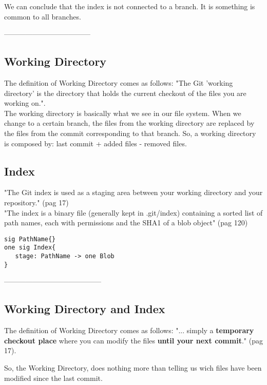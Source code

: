 We can conclude that the index is not connected to a branch. It is something is common to all branches.



------------------------------------
\subsection{Working Directory}
The definition of Working Directory comes as follows:
"The Git 'working directory' is the directory that holds 
the current checkout of the files you are working on.".\\

The working directory is basically what we see in our file 
system. When we change to a certain branch, the files from the 
working directory are replaced by the files from the commit 
corresponding to that branch. So, a working directory is 
composed by: last commit + added files - removed files.\\


\subsection{Index}
"The Git index is used as a staging area between your working directory and your repository." \cite{gitComm} (pag 17)\\
"The index is a binary file (generally kept in .git/index) containing a sorted list of path names, each with permissions and the
SHA1 of a blob object" \cite{gitComm} (pag 120)\\
\begin{lstlisting}
sig PathName{}
one sig Index{
   stage: PathName -> one Blob
}
\end{lstlisting}

-----------------------------------------


\subsection{Working Directory and Index}
The definition of Working Directory comes as follows:
"... simply a {\bf temporary checkout place} where you can 
modify the files {\bf until your next commit}."
\cite{gitComm} (pag 17). \par
So,
the Working Directory, does nothing more than telling
us wich files have been modified since the last commit.

